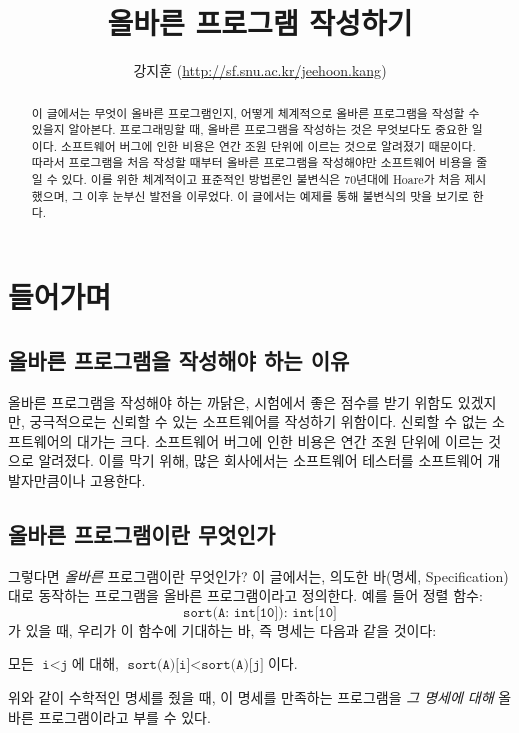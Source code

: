 \documentclass{oblivoir}
\theoremstyle{definition}
\begin{document}
\title{올바른 프로그램 작성하기}
\author{강지훈 (\url{http://sf.snu.ac.kr/jeehoon.kang})}
\maketitle

\begin{abstract}
  이 글에서는 무엇이 올바른 프로그램인지, 어떻게 체계적으로 올바른
  프로그램을 작성할 수 있을지 알아본다.  프로그래밍할 때, 올바른
  프로그램을 작성하는 것은 무엇보다도 중요한 일이다.  소프트웨어 버그에
  인한 비용은 연간 조원 단위에 이르는 것으로 알려졌기 때문이다.  따라서
  프로그램을 처음 작성할 때부터 올바른 프로그램을 작성해야만 소프트웨어
  비용을 줄일 수 있다.  이를 위한 체계적이고 표준적인 방법론인 불변식은
  70년대에 Hoare가 처음 제시했으며, 그 이후 눈부신 발전을 이루었다.  이
  글에서는 예제를 통해 불변식의 맛을 보기로 한다.
\end{abstract}

\section{들어가며}
\subsection{올바른 프로그램을 작성해야 하는 이유}
올바른 프로그램을 작성해야 하는 까닭은, 시험에서 좋은 점수를 받기
위함도 있겠지만, 궁극적으로는 신뢰할 수 있는 소프트웨어를 작성하기
위함이다.  신뢰할 수 없는 소프트웨어의 대가는 크다.  소프트웨어 버그에
인한 비용은 연간 조원 단위에 이르는 것으로 알려졌다.  이를 막기 위해,
많은 회사에서는 소프트웨어 테스터를 소프트웨어 개발자만큼이나
고용한다.

\subsection{올바른 프로그램이란 무엇인가}
그렇다면 \emph{올바른} 프로그램이란 무엇인가?  이 글에서는, 의도한
바(명세, Specification)대로 동작하는 프로그램을 올바른 프로그램이라고
정의한다.  예를 들어 정렬 함수:
\[\texttt{sort(A: int[10]): int[10]}\]
가 있을 때, 우리가 이 함수에 기대하는 바, 즉 명세는 다음과 같을
것이다:
\begin{center}모든 $\texttt{i}<\texttt{j}$에 대해,
  $\texttt{sort(A)[i]} < \texttt{sort(A)[j]}$이다.\end{center}
\noindent 위와 같이 수학적인 명세를 줬을 때, 이 명세를 만족하는
프로그램을 \emph{그 명세에 대해} 올바른 프로그램이라고 부를 수 있다.
\end{document}
